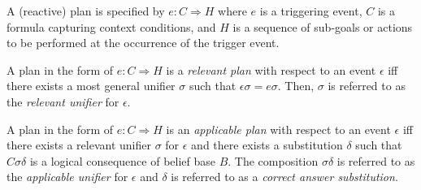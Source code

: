 \begin{definition}
[Plan] A (reactive) plan is specified by $e : C \Rightarrow H$ where $e$ is a triggering event, $C$ is a formula capturing context conditions, and $H$ is a sequence of sub-goals or actions to be performed at the occurrence of the trigger event.
\end{definition}

\begin{definition}
 A plan in the form of $e : C \Rightarrow H$ is a \emph{relevant plan} with respect to an event $\epsilon$ iff there exists a most general unifier $\sigma$ such that $\epsilon\sigma = e\sigma$. Then, $\sigma$ is referred to as the \emph{relevant unifier} for $\epsilon$.
\end{definition}

\begin{definition}
 A plan in the form of $e : C \Rightarrow H$ is an \emph{applicable plan} with respect to an event $\epsilon$ iff there exists a relevant unifier $\sigma$ for $\epsilon$ and there exists a substitution $\delta$ such that $C\sigma\delta$
is a logical consequence of belief base $B$. The composition $\sigma\delta$ is referred to as the \emph{applicable unifier} for $\epsilon$ and $\delta$ is referred to as a \emph{correct answer substitution}.
\end{definition}












